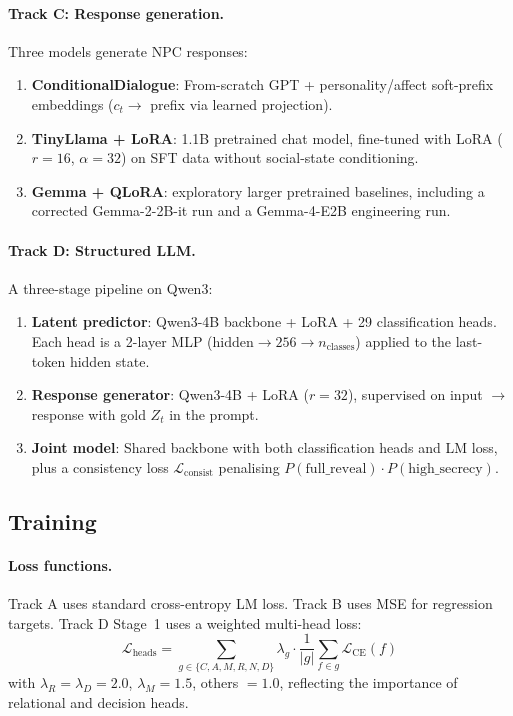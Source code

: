 \documentclass[11pt]{article}
\begin{document}
\paragraph{Track C: Response generation.}
Three models generate NPC responses:
\begin{enumerate}
    \item \textbf{ConditionalDialogue}: From-scratch GPT + personality/affect soft-prefix embeddings ($c_t \to$ prefix via learned projection).
    \item \textbf{TinyLlama + LoRA}: 1.1B pretrained chat model, fine-tuned with LoRA ($r=16$, $\alpha=32$) on SFT data without social-state conditioning.

    \item \textbf{Gemma + QLoRA}: exploratory larger pretrained baselines, including a corrected Gemma-2-2B-it run and a Gemma-4-E2B engineering run.
\end{enumerate}

\paragraph{Track D: Structured LLM.}
A three-stage pipeline on Qwen3:
\begin{enumerate}
    \item \textbf{Latent predictor}: Qwen3-4B backbone + LoRA + 29 classification heads. Each head is a 2-layer MLP ($\text{hidden} \to 256 \to n_\text{classes}$) applied to the last-token hidden state.
    \item \textbf{Response generator}: Qwen3-4B + LoRA ($r=32$), supervised on input $\to$ response with gold $Z_t$ in the prompt.
    \item \textbf{Joint model}: Shared backbone with both classification heads and LM loss, plus a consistency loss $\mathcal{L}_\text{consist}$ penalising $P(\text{full\_reveal}) \cdot P(\text{high\_secrecy})$.
\end{enumerate}

\subsection{Training}
\label{sec:training}

\paragraph{Loss functions.}
Track A uses standard cross-entropy LM loss.
Track B uses MSE for regression targets.
Track D Stage~1 uses a weighted multi-head loss:
\begin{equation}
    \mathcal{L}_\text{heads} = \sum_{g \in \{C,A,M,R,N,D\}} \lambda_g \cdot \frac{1}{|g|} \sum_{f \in g} \mathcal{L}_\text{CE}(f)
\end{equation}
with $\lambda_R = \lambda_D = 2.0$, $\lambda_M = 1.5$, others $= 1.0$, reflecting the importance of relational and decision heads.
\end{document}
